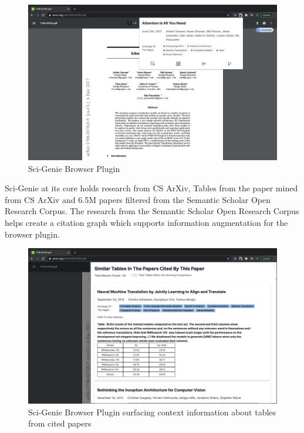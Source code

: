 \begin{figure}[h]
    \centering
    \includegraphics[width=\maxwidth{\textwidth}]{src/images/sci-genie-ext-exp.png}
    \caption{ Sci-Genie Browser Plugin}
    \label{figure\arabic{figurecounter}}
\end{figure}

Sci-Genie at its core holds research from CS ArXiv, Tables from the paper mined from CS ArXiv and 
6.5M papers filtered from the Semantic Scholar Open Research Corpus\parencite{ammar-etal-2018-construction}.
The research from the Semantic Scholar Open Research Corpus helps create a citation graph which supports 
information augmentation for the browser plugin. 

\begin{figure}[h]
    \centering
    \includegraphics[width=\maxwidth{\textwidth}]{src/images/sci-genie-ext-table-exp.png}
    \caption{Sci-Genie Browser Plugin surfacing context information about tables from cited papers }
    \label{figure\arabic{figurecounter}}
\end{figure}


